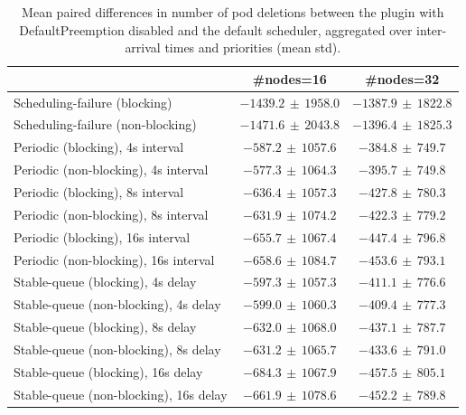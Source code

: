 \begin{table}[t]
\tiny
\setlength{\tabcolsep}{1.2pt}
\renewcommand{\arraystretch}{1.12}
\centering
\caption{Mean paired differences in number of pod deletions between the plugin with DefaultPreemption disabled and the default scheduler, aggregated over inter-arrival times and priorities (mean \pm std).}
\label{tab:deletions-defpreempt0-std1-agg-arrival-prio}
\begin{tabular}{l c c}
\toprule
 & \#nodes=16 & \#nodes=32 \\
\midrule
Scheduling-failure (blocking) & $-1439.2\,\pm\,1958.0$ & $-1387.9\,\pm\,1822.8$ \\
Scheduling-failure (non-blocking) & $-1471.6\,\pm\,2043.8$ & $-1396.4\,\pm\,1825.3$ \\
Periodic (blocking), 4s interval & $-587.2\,\pm\,1057.6$ & $-384.8\,\pm\,749.7$ \\
Periodic (non-blocking), 4s interval & $-577.3\,\pm\,1064.3$ & $-395.7\,\pm\,749.8$ \\
Periodic (blocking), 8s interval & $-636.4\,\pm\,1057.3$ & $-427.8\,\pm\,780.3$ \\
Periodic (non-blocking), 8s interval & $-631.9\,\pm\,1074.2$ & $-422.3\,\pm\,779.2$ \\
Periodic (blocking), 16s interval & $-655.7\,\pm\,1067.4$ & $-447.4\,\pm\,796.8$ \\
Periodic (non-blocking), 16s interval & $-658.6\,\pm\,1084.7$ & $-453.6\,\pm\,793.1$ \\
Stable-queue (blocking), 4s delay & $-597.3\,\pm\,1057.3$ & $-411.1\,\pm\,776.6$ \\
Stable-queue (non-blocking), 4s delay & $-599.0\,\pm\,1060.3$ & $-409.4\,\pm\,777.3$ \\
Stable-queue (blocking), 8s delay & $-632.0\,\pm\,1068.0$ & $-437.1\,\pm\,787.7$ \\
Stable-queue (non-blocking), 8s delay & $-631.2\,\pm\,1065.7$ & $-433.6\,\pm\,791.0$ \\
Stable-queue (blocking), 16s delay & $-684.3\,\pm\,1067.9$ & $-457.5\,\pm\,805.1$ \\
Stable-queue (non-blocking), 16s delay & $-661.9\,\pm\,1078.6$ & $-452.2\,\pm\,789.8$ \\
\bottomrule
\end{tabular}
\end{table}
